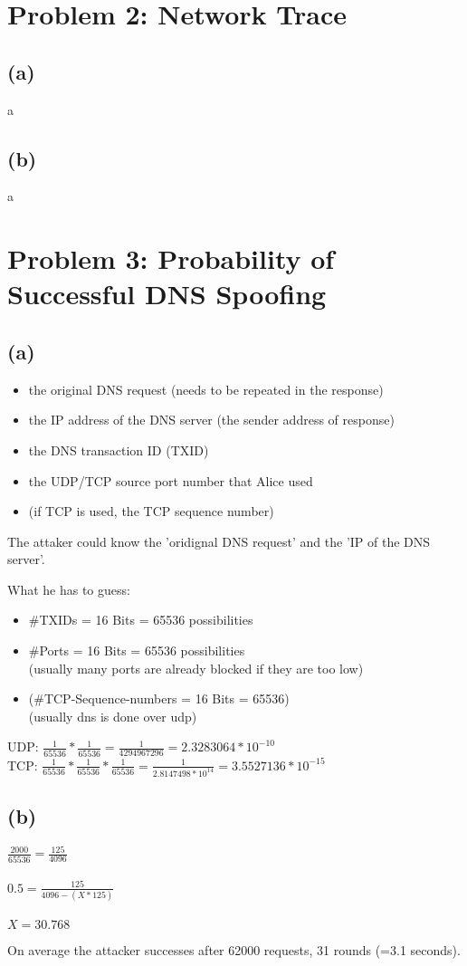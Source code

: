 \documentclass[12pt,pdftex,a4paper]{article}
\begin{document}
\newpage
\section*{Problem 2: Network Trace}
\subsection*{(a)}
a

\subsection*{(b)}
a

\section*{Problem 3: Probability of Successful DNS Spoofing}
\subsection*{(a)}
\begin{itemize}
	\item the original DNS request (needs to be repeated in the response)
	\item the IP address of the DNS server (the sender address of response)
	\item the DNS transaction ID (TXID)
	\item the UDP/TCP source port number that Alice used
	\item (if TCP is used, the TCP sequence number)
\end{itemize}

The attaker could know the 'oridignal DNS request' and the 'IP of the DNS server'.

What he has to guess:

\begin{itemize}
	\item \#TXIDs = 16 Bits = 65536 possibilities
	\item \#Ports = 16 Bits = 65536 possibilities\\(usually many ports are already blocked if they are too low)
	\item (\#TCP-Sequence-numbers = 16 Bits = 65536)\\(usually dns is done over udp)
\end{itemize}

UDP: $ \frac{1}{65536} * \frac{1}{65536} = \frac{1}{4294967296} = 2.3283064*10^{-10} $
\\

TCP: $ \frac{1}{65536} * \frac{1}{65536} * \frac{1}{65536} = \frac{1}{2.8147498*10^{14}} = 3.5527136*10^{-15} $

\subsection*{(b)}
$ \frac{2000}{65536} = \frac{125}{4096} $
\\~\\
$ 0.5 = \frac{125}{4096-(X*125)}$
\\~\\
$ X = 30.768 $

On average the attacker successes after 62000 requests, 31 rounds (=3.1 seconds).
\end{document}
